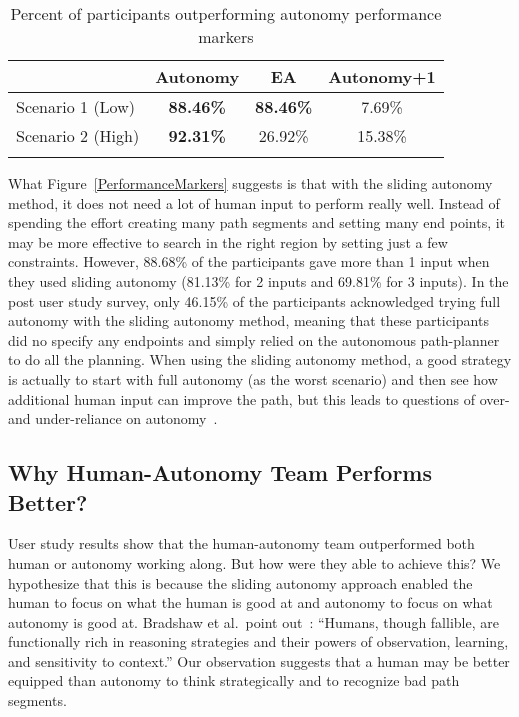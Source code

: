 \begin{table}
\caption{Percent of participants outperforming autonomy performance markers}
	\centering
		\begin{tabular}
			{|l|c|c|c|}
			\hline
			 & Autonomy & EA & Autonomy+1 \\
			\hline
			Scenario 1 (Low) & \textbf{88.46\%} & \textbf{88.46\%} & 7.69\% \\
			\hline
			Scenario 2 (High) & \textbf{92.31\%} & 26.92\% & 15.38\% \\
			\hline
			\multicolumn{4}{c}{}  %
		\end{tabular}
\label{CompareToMarkers}
\end{table}

What Figure~\ref{PerformanceMarkers} suggests is that with the sliding autonomy method, it does not need a lot of human input to perform really well. Instead of spending the effort creating many path segments and setting many end points, it may be more effective to search in the right region by setting just a few constraints. However, 88.68\% of the participants gave more than 1 input when they used sliding autonomy (81.13\% for 2 inputs and 69.81\% for 3 inputs). In the post user study survey, only 46.15\% of the participants acknowledged trying full autonomy with the sliding autonomy method, meaning that these participants did no specify any endpoints and simply relied on the autonomous path-planner to do all the planning. When using the sliding autonomy method, a good strategy is actually to start with full autonomy (as the worst scenario) and then see how additional human input can improve the path, but this leads to questions of over- and under-reliance on autonomy~\cite{Bradshaw2013Seven}.

\subsection{Why Human-Autonomy Team Performs Better?}

User study results show that the human-autonomy team outperformed both human or autonomy working along. But how were they able to achieve this? We hypothesize that this is because the sliding autonomy approach enabled the human to focus on what the human is good at and autonomy to focus on what autonomy is good at. Bradshaw et al.\ point out~\cite{Bradshaw2013Seven}: ``Humans, though fallible, are functionally rich in reasoning strategies and their powers of observation, learning, and sensitivity to context.'' Our observation suggests that a human may be better equipped than autonomy to think strategically and to recognize bad path segments.

